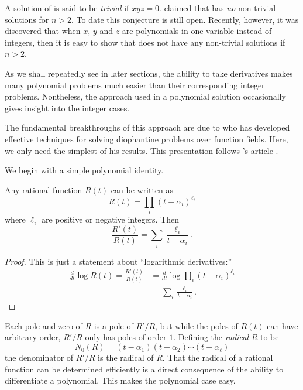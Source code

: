 A solution of  is said to be {\em trivial} if $xyz =
0$.  {\Fermat} claimed that  has {\em no} non-trivial
solutions for $n > 2$.  To date this conjecture is still open.
Recently, however, it was discovered that when $x$, $y$ and $z$ are
polynomials in one variable instead of integers, then it is easy to
show that  does not have any non-trivial solutions if
$n > 2$.

As we shall repeatedly see in later sections, the ability to take
derivatives makes many polynomial problems much easier than their
corresponding integer problems.  Nontheless, the approach used in a
polynomial solution occasionally gives insight into the  integer
cases.  

The fundamental breakthroughs of this approach are due to {\Mason}
\cite{Mason1984-mb} who has developed effective techniques for solving
diophantine problems over function fields.  Here, we only need the
simplest of his results.  This presentation follows {\Lang}'s article
\cite{Lang1990-hv}.

We begin with a simple polynomial identity.

\begin{proposition}\label{Ratfun:LogDeriv:Prop}
Any rational function $R(t)$ can be written as 
\[
R(t) = \prod_i(t - \alpha_i)^{\ell_i}
\]
where $\ell_i$ are positive or negative integers.  Then
\[
\frac{R'(t)}{R(t)} = \sum_i \frac{\ell_i}{t - \alpha_i}.
\]
\end{proposition}

\begin{proof}
This is just a statement about ``logarithmic derivatives:''
\[
\begin{aligned}
  \frac{d}{dt} \log R(t) = \frac{R'(t)}{R(t)} 
    & = \frac{d}{dt} \log \prod_i(t - \alpha_i)^{\ell_i} \\
    & = \sum_i \frac{\ell_i}{t - \alpha_i}.
\end{aligned}
\]
\end{proof}


Each pole and zero of $R$ is a pole of $R'/R$, but while the poles of
$R(t)$ can have arbitrary order, $R'/R$ only has poles of order $1$.
Defining the {\em radical} $R$ to be
\[
N_0(R) = (t - \alpha_1)  (t - \alpha_2) \cdots (t - \alpha_{\ell})
\]
the denominator of $R'/R$ is the radical of $R$.  That the radical of
a rational function can be determined efficiently is a direct
consequence of the ability to differentiate a polynomial.  This makes
the polynomial case easy.

